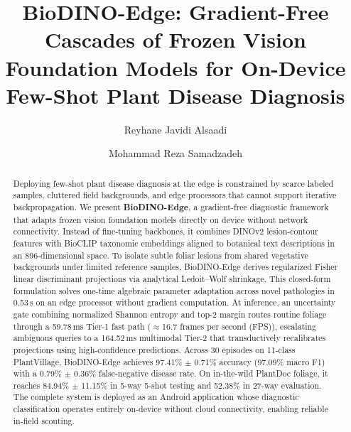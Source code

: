 \begin{frontmatter}

\title{BioDINO-Edge: Gradient-Free Cascades of Frozen Vision Foundation Models for On-Device Few-Shot Plant Disease Diagnosis}

\author[1]{Reyhane Javidi Alsaadi}

\author[1]{Mohammad Reza Samadzadeh}



\begin{abstract}
Deploying few-shot plant disease diagnosis at the edge is constrained by scarce labeled samples, cluttered field backgrounds, and edge processors that cannot support iterative backpropagation. We present \textbf{BioDINO-Edge}, a gradient-free diagnostic framework that adapts frozen vision foundation models directly on device without network connectivity. Instead of fine-tuning backbones, it combines DINOv2 lesion-contour features with BioCLIP taxonomic embeddings aligned to botanical text descriptions in an 896-dimensional space. To isolate subtle foliar lesions from shared vegetative backgrounds under limited reference samples, BioDINO-Edge derives regularized Fisher linear discriminant projections via analytical Ledoit--Wolf shrinkage. This closed-form formulation solves one-time algebraic parameter adaptation across novel pathologies in 0.53\,s on an edge processor without gradient computation. At inference, an uncertainty gate combining normalized Shannon entropy and top-2 margin routes routine foliage through a 59.78\,ms Tier-1 fast path ($\approx$16.7 frames per second (FPS)), escalating ambiguous queries to a 164.52\,ms multimodal Tier-2 that transductively recalibrates projections using high-confidence predictions. Across 30 episodes on 11-class PlantVillage, BioDINO-Edge achieves 97.41\% $\pm$ 0.71\% accuracy (97.09\% macro F1) with a 0.79\% $\pm$ 0.36\% false-negative disease rate. On in-the-wild PlantDoc foliage, it reaches 84.94\% $\pm$ 11.15\% in 5-way 5-shot testing and 52.38\% in 27-way evaluation. The complete system is deployed as an Android application whose diagnostic classification operates entirely on-device without cloud connectivity, enabling reliable in-field scouting.
\end{abstract}


\end{frontmatter}
